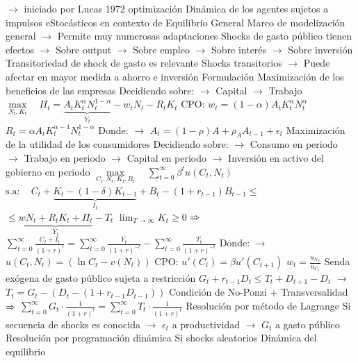 \documentclass{nuevotema}
\begin{document}
\begin{esquemal}
				\4[] $\to$ iniciado por Lucas 1972
				\4[] optimización Dinámica de los agentes
				\4[] sujetos a impulsos eStocásticos
				\4[] en contexto de Equilibrio General
				\4[] Marco de modelización general
				\4[] $\to$ Permite muy numerosas adaptaciones
				\4[] Shocks de gasto público tienen efectos
				\4[] $\to$ Sobre output
				\4[] $\to$ Sobre empleo
				\4[] $\to$ Sobre interés
				\4[] $\to$ Sobre inversión
				\4[] Transitoriedad de shock de gasto es relevante
				\4[] Shocks transitorios
				\4[] $\to$ Puede afectar en mayor medida a ahorro e inversión
			\3 Formulación
				\4 Maximización de los beneficios de las empresas
				\4[] Decidiendo sobre:
				\4[] $\to$ Capital
				\4[] $\to$ Trabajo
				\4[] $\underset{N_t, K_t}{\max} \quad \Pi_t = \underbrace{A_t K_t^\alpha N_t^{1-\alpha}}_{Y_t} - w_t N_t - R_t K_t$
				\4[] CPO: \quad $w_t = (1-\alpha) A_t K_t^\alpha N_t^\alpha$
				\4[] \quad \quad $R_t = \alpha A_t K_t^{\alpha-1} N_t^{1-\alpha}$
				\4[] Donde:
				\4[] $\to$ $A_t = (1-\rho)A + \rho_A A_{t-1} + \epsilon_t$
				\4 Maximización de la utilidad de los consumidores
				\4[] Decidiendo sobre:
				\4[] $\to$ Consumo en periodo
				\4[] $\to$ Trabajo en periodo
				\4[] $\to$ Capital en periodo
				\4[] $\to$ Inversión en activo del gobierno en periodo
				\4[] $\underset{C_t, N_t,K_t, B_t}{\max} \quad \sum_{t=0}^\infty \beta^t u(C_t, N_t)$
				\4[] $\text{s.a}: \quad C_t+\underbrace{K_t - (1-\delta)K_{t-1}}_{I_t} + B_t - (1+r_{t-1})B_{t-1} \leq$
				\4[] \quad \quad \quad $\leq \underbrace{wN_t + R_t K_t + \Pi_t}_{Y_t} - T_t$
				\4[] \quad \quad \quad $\lim_{T \to \infty}  K_t \geq 0$
				\4[] \quad \quad \quad $\Rightarrow$ $\sum_{t=0}^\infty \frac{C_t + I_t}{(1+r)^t} = \sum_{t=0}^\infty \frac{ Y_t}{(1+r)^{-t}} - \sum_{t=0}^\infty \frac{T_t}{(1+r)^{-t}}$
				\4[] Donde:
				\4[] $\to$ $u(C_t, N_t) = \left( \ln C_t  - v(N_t) \right)$
				\4[] CPO: \quad $u'(C_t) = \beta u'(C_{t+1})$
				\4[] \quad \quad $w_t = \frac{u_{N_T}}{u_{C_t}}$
				\4 Senda exógena de gasto público sujeta a restricción
				\4[] $G_t + r_{t-1} D_t \leq T_t + D_{t+1} - D_t$
				\4[] $\to$ $T_t = G_t - \left( D_t - (1+r_{t-1} D_{t-1}) \right)$
				\4[] Condición de No-Ponzi + Transversalidad
				\4[] $\Rightarrow$ $\sum_{t=0}^\infty G_t \cdot \frac{1}{(1+r)^t} = \sum_{t=0}^\infty T_t \cdot \frac{1}{(1+r)^t}$
				\4 Resolución por método de Lagrange
				\4[] Si secuencia de shocks es conocida
				\4[] $\to$ $\epsilon_t$ a productividad
				\4[] $\to$ $G_t$ a gasto público
				\4 Resolución por programación dinámica
				\4[] Si shocks aleatorios
				\4 Dinámica del equilibrio

\end{esquemal}
\end{document}
